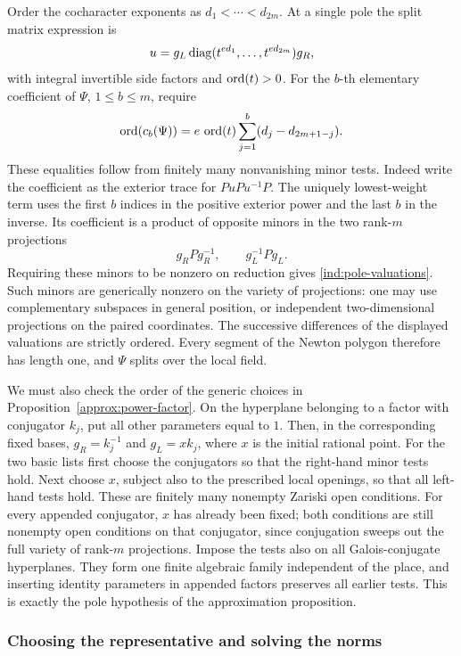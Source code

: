 Order the cocharacter exponents as $d_1<\cdots<d_{2m}$.  At a single
pole the split matrix expression is
\[
 u=g_L\operatorname{diag}(t^{ed_1},\ldots,t^{ed_{2m}})g_R,
\]
with integral invertible side factors and $\operatorname{ord}(t)>0$.  For the $b$-th
elementary coefficient of $\Psi$, $1\leq b\leq m$, require
\begin{equation}\label{ind:pole-valuations}
 \operatorname{ord}(c_b(\Psi))=e\,\operatorname{ord}(t)
                   \sum_{j=1}^b(d_j-d_{2m+1-j}).
\end{equation}
These equalities follow from finitely many nonvanishing minor tests.
Indeed write the coefficient as the exterior trace for
$P u P u^{-1}P$.  The uniquely lowest-weight term uses the first $b$
indices in the positive exterior power and the last $b$ in the inverse.
Its coefficient is a product of opposite minors in the two rank-$m$
projections
\[
                    g_R P g_R^{-1},\qquad g_L^{-1}P g_L.
\]
Requiring these minors to be nonzero on reduction gives
\eqref{ind:pole-valuations}.  Such minors are generically nonzero on
the variety of projections: one may use complementary subspaces in
general position, or independent two-dimensional projections on the
paired coordinates.  The successive differences of the displayed
valuations are strictly ordered.  Every segment of the Newton polygon
therefore has length one, and $\Psi$ splits over the local field.

We must also check the order of the generic choices in
Proposition~\ref{approx:power-factor}.  On the hyperplane belonging to a
factor with conjugator $k_j$, put all other parameters equal to $1$.
Then, in the corresponding fixed bases, $g_R=k_j^{-1}$ and $g_L=xk_j$,
where $x$ is the initial rational point.  For the two basic lists first
choose the conjugators so that the right-hand minor tests hold.  Next
choose $x$, subject also to the prescribed local openings, so that all
left-hand tests hold.  These are finitely many nonempty Zariski open
conditions.  For every appended conjugator, $x$ has already been fixed;
both conditions are still nonempty open conditions on that conjugator,
since conjugation sweeps out the full variety of rank-$m$ projections.
Impose the tests also on all Galois-conjugate hyperplanes.  They form one
finite algebraic family independent of the place, and inserting identity
parameters in appended factors preserves all earlier tests.  This is
exactly the pole hypothesis of the approximation proposition.

\subsubsection{Choosing the representative and solving the norms}

